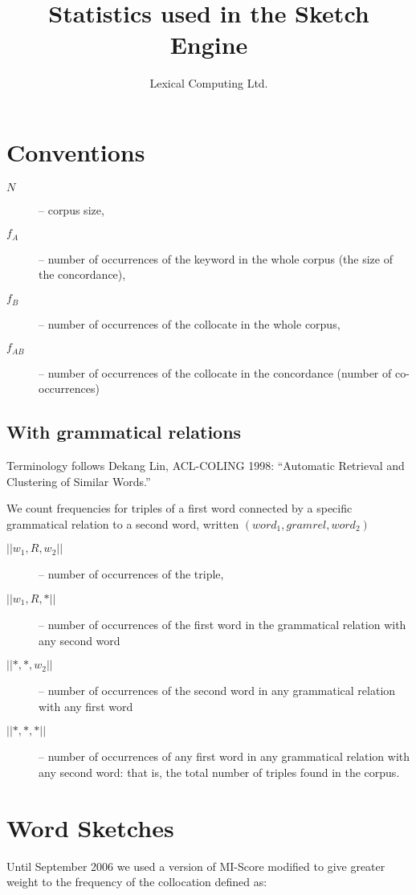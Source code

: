 \documentclass{article}
\title{Statistics used in the Sketch Engine}
\author{Lexical Computing Ltd.}
\begin{document}
\maketitle
\section {Conventions}
\begin{description}
\item[$N$]-- corpus size, 
\item[$f_A$]-- number of occurrences of the keyword in the whole corpus
(the size of the concordance), 
\item[$f_B$]-- number of occurrences of the collocate in the whole corpus,
\item[$f_{AB}$]-- number of occurrences of the collocate in the concordance
(number of co-occurrences)
\end{description}

\subsection{With grammatical relations}

Terminology follows Dekang Lin, ACL-COLING 1998: ``Automatic Retrieval and Clustering of Similar Words.''

We count frequencies for triples  of a first word  connected by a specific grammatical relation to a second word, written $(word_1, gramrel, word_2)$
\begin{description}
\item[$||w_1,R,w_2||$]-- number of occurrences of the triple, 
\item[$||w_1,R,*||$]--  number of occurrences of the first word in the grammatical relation with any second word
\item[$||*, *, w_2||$]--  number of occurrences of the second word in any grammatical relation with any first word
\item[$||*, *, *||$]--  number of occurrences of any first word in any grammatical relation with any second word: that is, the total number of triples found in the corpus.
\end{description}

\section{Word Sketches}

Until September 2006 we used a version of MI-Score modified to give greater weight to the frequency of the collocation  defined as:
\end{document}
